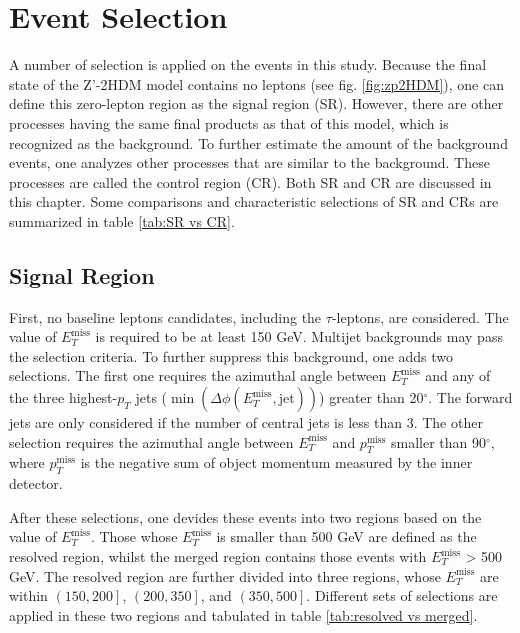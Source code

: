 \documentclass[class=NCU_thesis, crop=false]{standalone}
\begin{document}
\chapter{Event Selection}\label{Event selection}
A number of selection is applied on the events in this study. Because the final state of the Z'-2HDM model contains no leptons (see fig. \ref{fig:zp2HDM}), one can define this zero-lepton region as the signal region (SR). However, there are other processes having the same final products as that of this model, which is recognized as the background. To further estimate the amount of the background events, one analyzes other processes that are similar to the background. These processes are called the control region (CR). Both SR and CR are discussed in this chapter. Some comparisons and characteristic selections of SR and CRs are summarized in table \ref{tab:SR vs CR}.

\section{Signal Region}\label{SR}
	First, no baseline leptons candidates, including the $\tau$-leptons, are considered. The value of $E_T^{\mathrm{miss}}$ is required to be at least 150 GeV. Multijet backgrounds may pass the selection criteria. To further suppress this background, one adds two selections. The first one requires the azimuthal angle between $E_T^{\mathrm{miss}}$ and any of the three highest-$p_T$ jets ($\min(\Delta \phi(E_T^{\mathrm{miss}}, \mathrm{jet}))$) greater than 20$^\circ$. The forward jets are only considered if the number of central jets is less than 3. The other selection requires the azimuthal angle between $E_T^{\mathrm{miss}}$ and $p_T^{\mathrm{miss}}$ smaller than 90$^\circ$, where $p_T^{\mathrm{miss}}$ is the negative sum of object momentum measured by the inner detector.

	After these selections, one devides these events into two regions based on the value of $E_T^{\mathrm{miss}}$. Those whose $E_T^{\mathrm{miss}}$ is smaller than 500 GeV are defined as the resolved region, whilst the merged region contains those events with $E_T^{\mathrm{miss}}$ > 500 GeV. The resolved region are further divided into three regions, whose $E_T^{\mathrm{miss}}$ are within $\left(150, 200\right]$, $\left(200, 350\right]$, and $\left(350, 500\right]$. Different sets of selections are applied in these two regions and tabulated in table \ref{tab:resolved vs merged}.
\end{document}
